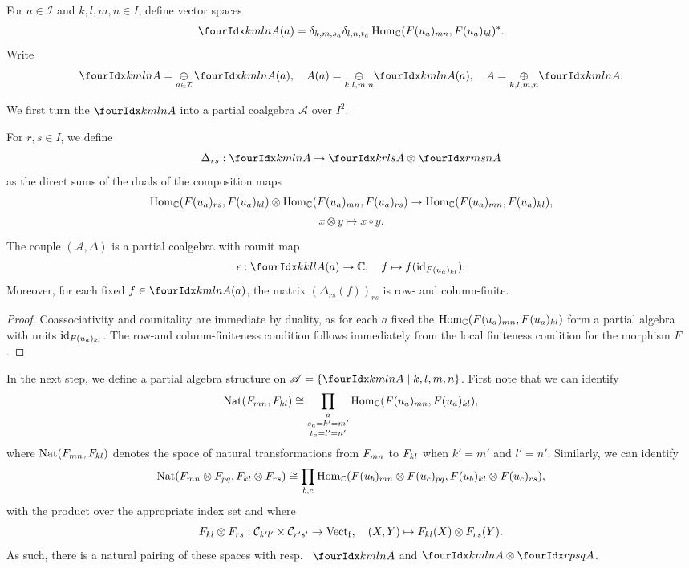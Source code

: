 \begin{Def} For $a\in \mathcal{I}$ and $k,l,m,n\in I$, define vector spaces \[\Gr{A}{k}{l}{m}{n}(a) =  \delta_{k,m,s_a}\delta_{l,n,t_a} \Hom_{\C}(\Forget(u_a)_{mn},\Forget(u_a)_{kl})^*.\] Write \[\Gr{A}{k}{l}{m}{n} =\underset{a\in \mathcal{I}}{\oplus}\, \Gr{A}{k}{l}{m}{n}(a),\quad A(a) = \underset{k,l,m,n}{\oplus} \Gr{A}{k}{l}{m}{n}(a),\quad A = \underset{k,l,m,n}{\oplus} \Gr{A}{k}{l}{m}{n}.\] 
\end{Def} 


We first turn the $\Gr{A}{k}{l}{m}{n}$ into a partial coalgebra $\mathscr{A}$ over $I^2$.

\begin{Def} For $r,s\in I$, we define \[\Delta_{rs}: \Gr{A}{k}{l}{m}{n}\rightarrow \Gr{A}{k}{l}{r}{s}\otimes \Gr{A}{r}{s}{m}{n}\] as the direct sums of the duals of the composition maps \[\operatorname{Hom}_{\mathbb{C}}(F(u_a)_{rs},F(u_a)_{kl}) \otimes \operatorname{Hom}_{\mathbb{C}}(F(u_a)_{mn},F(u_a)_{rs})\rightarrow \operatorname{Hom}_{\mathbb{C}}(F(u_a)_{mn},F(u_a)_{kl}),\]\[x\otimes y \mapsto x\circ y.\]
\end{Def} 

\begin{Lem} The couple $(\mathscr{A},\Delta)$ is a partial coalgebra with counit map \[\epsilon:\Gr{A(a)}{k}{l}{k}{l}\rightarrow \C,\quad f\mapsto f(\id_{\Forget(u_a)_{kl}}).\] Moreover, for each fixed $f\in \Gr{A(a)}{k}{l}{m}{n}$, the matrix $\left(\Delta_{rs}(f)\right)_{rs}$ is row- and column-finite.
\end{Lem} 
\begin{proof} Coassociativity and counitality are immediate by duality, as for each $a$ fixed the $\operatorname{Hom}_{\mathbb{C}}(F(u_a)_{mn},F(u_a)_{kl})$ form a partial algebra with units $\operatorname{id}_{F(u_a)_{kl}}$. The row-and column-finiteness condition follows immediately from the local finiteness condition for the morphism $F$.
\end{proof}

In the next step, we define a partial algebra structure on $\mathscr{A} = \{\Gr{A}{k}{l}{m}{n}\mid k,l,m,n\}$. First note that we can identify \[\operatorname{\mathrm{Nat}}(F_{mn},F_{kl}) \cong \underset{t_a=l'=n'}{\underset{s_a=k'=m'}{\prod_a}} \operatorname{Hom}_{\mathbb{C}}(F(u_a)_{mn},F(u_a)_{kl}),\] where $\operatorname{\mathrm{Nat}}(F_{mn},F_{kl})$ denotes the space of natural transformations from $F_{mn}$ to $F_{kl}$ when $k'=m'$ and $l'=n'$. Similarly, we can identify \[\operatorname{\mathrm{Nat}}(F_{mn}\otimes F_{pq},F_{kl}\otimes F_{rs}) \cong  \prod_{b,c} \operatorname{Hom}_{\mathbb{C}}(F(u_b)_{mn}\otimes F(u_c)_{pq} ,F(u_b)_{kl}\otimes F(u_c)_{rs}),\] with the product over the appropriate index set and where \[F_{kl}\otimes F_{rs}:\mathcal{C}_{k'l'}\times \mathcal{C}_{r's'}\rightarrow \mathrm{Vect}_{\operatorname{\mathrm{f}}},\quad (X,Y) \mapsto F_{kl}(X)\otimes F_{rs}(Y).\] As such, there is a natural pairing of these spaces with resp.~ $\Gr{A}{k}{l}{m}{n}$ and $\Gr{A}{k}{l}{m}{n}\otimes \Gr{A}{r}{s}{p}{q}$. 

